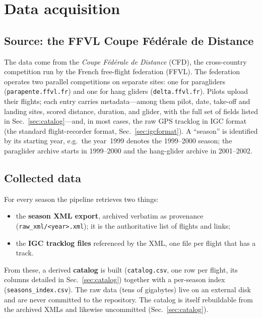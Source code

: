 \section{Data acquisition}
\label{sec:acquisition}

\subsection{Source: the FFVL Coupe F\'ed\'erale de Distance}

The data come from the \emph{Coupe F\'ed\'erale de Distance} (CFD), the cross-country
competition run by the French free-flight federation (FFVL). The federation operates two
parallel competitions on separate sites: one for paragliders
(\texttt{parapente.ffvl.fr}) and one for hang gliders (\texttt{delta.ffvl.fr}). Pilots
upload their flights; each entry carries metadata---among them pilot, date, take-off
and landing sites, scored distance, duration, and glider, with the full set of fields
listed in Sec.~\ref{sec:catalog}---and, in most cases, the raw GPS tracklog in IGC format
(the standard flight-recorder format, Sec.~\ref{sec:igcformat}).
A ``season'' is identified by its starting year,
e.g.\ the year~1999 denotes the 1999--2000 season; the paraglider archive starts in
1999--2000 and the hang-glider archive in 2001--2002.

\subsection{Collected data}

For every season the pipeline retrieves two things:
\begin{itemize}
  \item the \textbf{season XML export}, archived verbatim as provenance
        (\texttt{raw\_xml/<year>.xml}); it is the authoritative list of flights and links;
  \item the \textbf{IGC tracklog files} referenced by the XML, one file per flight that
        has a track.
\end{itemize}
From these, a derived \textbf{catalog} is built (\texttt{catalog.csv}, one row per flight,
its columns detailed in Sec.~\ref{sec:catalog}) together with a per-season index
(\texttt{seasons\_index.csv}). The raw data (tens of gigabytes) live on an external disk
and are never committed to the repository. The catalog is itself rebuildable from
the archived XMLs and likewise uncommitted (Sec.~\ref{sec:catalog}).

